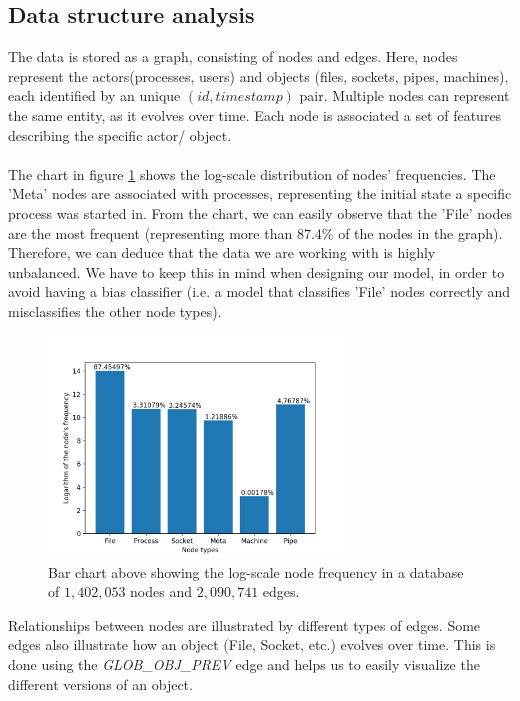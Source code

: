 	\subsection{Data structure analysis} \label{Section: prep/datastructure}
	The data is stored as a graph, consisting of nodes and edges. Here, nodes represent the actors(processes, users) and objects (files, sockets, pipes, machines), each identified by an unique $(id, timestamp)$ pair. Multiple nodes can represent the same entity, as it evolves over time. Each node is associated a set of features describing the specific actor/ object. 
	\\ \\
	The chart in figure \ref{Figure 2.1.1} shows the log-scale distribution of nodes' frequencies. The 'Meta' nodes are associated with processes, representing the initial state a specific process was started in. From the chart, we can easily observe that the 'File' nodes are the most frequent (representing more than $87.4\%$ of the nodes in the graph). Therefore, we can deduce that the data we are working with is highly unbalanced. We have to keep this in mind when designing our model, in order to avoid having a bias classifier (i.e. a model that classifies 'File' nodes correctly and misclassifies the other node types). 
	\begin{figure}[H]
		\centering

		\includegraphics[width=0.7\textwidth]{graphics/node-freq-graph}
		\caption[\textbf{Log-scale node frequency}]{
			Bar chart above showing the log-scale node frequency in a database of $1,402,053$ nodes and $2,090,741$ edges. 
		}
		\label{Figure 2.1.1}
	\end{figure}
	Relationships between nodes are illustrated by different types of edges. Some edges also illustrate how an object (File, Socket, etc.) evolves over time. This is done using the \textit{GLOB\_OBJ\_PREV} edge and helps us to easily visualize the different versions of an object.
